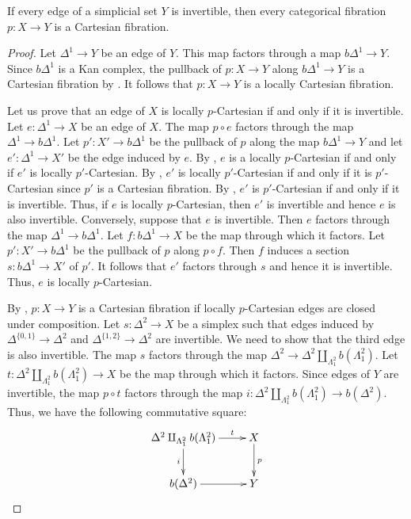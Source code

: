 \documentclass[reqno]{amsart}
\theoremstyle{definition}
\theoremstyle{remark}
\newcommand{\bDelta}{b \Delta}
\numberwithin{figure}{section}
\begin{document}
\begin{prop}[G-Cart]
If every edge of a simplicial set $Y$ is invertible, then every categorical fibration $p : X \to Y$ is a Cartesian fibration.
\end{prop}
\begin{proof}
Let $\Delta^1 \to Y$ be an edge of $Y$.
This map factors through a map $\bDelta^1 \to Y$.
Since $\bDelta^1$ is a Kan complex, the pullback of $p : X \to Y$ along $\bDelta^1 \to Y$ is a Cartesian fibration by \cite[Proposition~.3.3.1.8]{lurie-topos}.
It follows that $p : X \to Y$ is a locally Cartesian fibration.

Let us prove that an edge of $X$ is locally $p$-Cartesian if and only if it is invertible.
Let $e : \Delta^1 \to X$ be an edge of $X$.
The map $p \circ e$ factors through the map $\Delta^1 \to \bDelta^1$.
Let $p' : X' \to \bDelta^1$ be the pullback of $p$ along the map $\bDelta^1 \to Y$ and let $e' : \Delta^1 \to X'$ be the edge induced by $e$.
By \cite[Remark~2.4.1.12]{lurie-topos}, $e$ is a locally $p$-Cartesian if and only if $e'$ is locally $p'$-Cartesian.
By \cite[Proposition~2.4.2.8]{lurie-topos}, $e'$ is locally $p'$-Cartesian if and only if it is $p'$-Cartesian since $p'$ is a Cartesian fibration.
By \cite[Proposition~2.4.1.5]{lurie-topos}, $e'$ is $p'$-Cartesian if and only if it is invertible.
Thus, if $e$ is locally $p$-Cartesian, then $e'$ is invertible and hence $e$ is also invertible.
Conversely, suppose that $e$ is invertible.
Then $e$ factors through the map $\Delta^1 \to \bDelta^1$.
Let $f : \bDelta^1 \to X$ be the map through which it factors.
Let $p' : X' \to \bDelta^1$ be the pullback of $p$ along $p \circ f$.
Then $f$ induces a section $s : \bDelta^1 \to X'$ of $p'$.
It follows that $e'$ factors through $s$ and hence it is invertible.
Thus, $e$ is locally $p$-Cartesian.

By \cite[Proposition~2.4.2.8]{lurie-topos}, $p : X \to Y$ is a Cartesian fibration if locally $p$-Cartesian edges are closed under composition.
Let $s : \Delta^2 \to X$ be a simplex such that edges induced by $\Delta^{\{0,1\}} \to \Delta^2$ and $\Delta^{\{1,2\}} \to \Delta^2$ are invertible.
We need to show that the third edge is also invertible.
The map $s$ factors through the map $\Delta^2 \to \Delta^2 \amalg_{\Lambda^2_1} b(\Lambda^2_1)$.
Let $t : \Delta^2 \amalg_{\Lambda^2_1} b(\Lambda^2_1) \to X$ be the map through which it factors.
Since edges of $Y$ are invertible, the map $p \circ t$ factors through the map $i : \Delta^2 \amalg_{\Lambda^2_1} b(\Lambda^2_1) \to b(\Delta^2)$.
Thus, we have the following commutative square:
\[ \xymatrix{ \Delta^2 \amalg_{\Lambda^2_1} b(\Lambda^2_1) \ar[r]^-t \ar[d]_i   & X \ar[d]^p \\
              b(\Delta^2) \ar[r]                                                & Y
            } \]


\end{proof}
\end{document}
